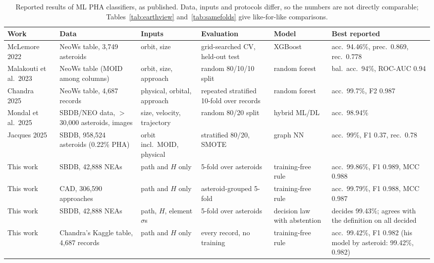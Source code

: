 \documentclass[conference]{IEEEtran}
\begin{document}
\begin{table}[t]
\centering
\caption{Reported results of ML PHA classifiers, as published. Data, inputs and protocols differ, so the numbers are not directly comparable; Tables~\ref{tab:earthview} and~\ref{tab:samefolds} give like-for-like comparisons.}
\label{tab:literature}
\footnotesize
\setlength{\tabcolsep}{3.5pt}
\begin{tabularx}{\textwidth}{@{}>{\raggedright\arraybackslash}p{2.6cm}YYY>{\raggedright\arraybackslash}p{1.7cm}Y@{}}
\toprule
Work & Data & Inputs & Evaluation & Model & Best reported \\
\midrule
McLemore 2022~\cite{mclemore2022} & NeoWs table, 3,749 asteroids & orbit, size & grid-searched CV, held-out test & XGBoost & acc.\ 94.46\%, prec.\ 0.869, rec.\ 0.778 \\
Malakouti et al.\ 2023~\cite{malakouti2023} & NeoWs table (MOID among columns) & orbit, size, approach & random 80/10/10 split & random forest & bal.\ acc.\ 94\%, ROC-AUC 0.94 \\
Chandra 2025~\cite{chandra2025} & NeoWs table, 4,687 records & physical, orbital, approach & repeated stratified 10-fold over records & random forest & acc.\ 99.7\%, F2 0.987 \\
Mondal et al.\ 2025~\cite{mondal2025} & SBDB/NEO data, $>$30,000 asteroids, images & size, velocity, trajectory & random 80/20 split & hybrid ML/DL & acc.\ 98.94\% \\
Jacques 2025~\cite{jacques2025} & SBDB, 958,524 asteroids (0.22\% PHA) & orbit incl.\ MOID, physical & stratified 80/20, SMOTE & graph NN & acc.\ 99\%, F1 0.37, rec.\ 0.78 \\
\midrule
This work & SBDB, 42,888 NEAs & path and $H$ only & 5-fold over asteroids & training-free rule & acc.\ 99.86\%, F1 0.989, MCC 0.988 \\
This work & CAD, 306,590 approaches & path and $H$ only & asteroid-grouped 5-fold & training-free rule & acc.\ 99.79\%, F1 0.988, MCC 0.987 \\
This work & SBDB, 42,888 NEAs & path, $H$, element $\sigma$s & 5-fold over asteroids & decision law with abstention & decides 99.43\%; agrees with the definition on all decided \\
This work & Chandra's Kaggle table, 4,687 records~\cite{kaggle_nasa} & path and $H$ only & every record, no training & training-free rule & acc.\ 99.42\%, F1 0.982 (his model by asteroid: 99.42\%, 0.982) \\
\bottomrule
\end{tabularx}
\end{table}
\end{document}
